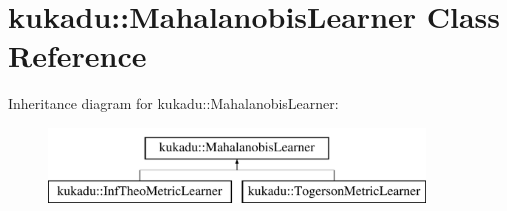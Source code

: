 \hypertarget{classkukadu_1_1MahalanobisLearner}{\section{kukadu\-:\-:Mahalanobis\-Learner Class Reference}
\label{classkukadu_1_1MahalanobisLearner}
}
Inheritance diagram for kukadu\-:\-:Mahalanobis\-Learner\-:\begin{figure}[H]
\begin{center}
\leavevmode
\includegraphics[height=2.000000cm]{classkukadu_1_1MahalanobisLearner}
\end{center}
\end{figure}
